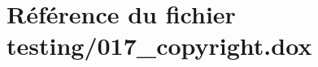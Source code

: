 \hypertarget{017__copyright_8dox}{}\section{Référence du fichier testing/017\+\_\+copyright.dox}
\label{017__copyright_8dox}
